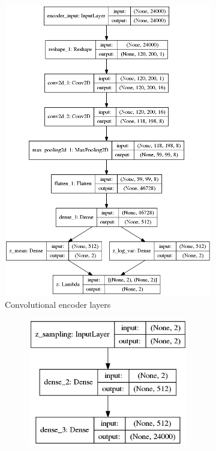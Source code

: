 \documentclass[a4paper]{article}
\begin{document}
\begin{figure}[h!]
	\centering
	\begin{subfigure}{.49\textwidth}
		\centering
		\includegraphics[width=1\linewidth]{vae_mlp_encoder}
		\caption{Convolutional encoder layers}
		\label{fig:encoder}
	\end{subfigure}
	\begin{subfigure}{.49\textwidth}
		\centering
		\begin{subfigure}{.6\textwidth}
			\centering
			\includegraphics[width=1\linewidth]{vae_mlp_decoder}

\end{subfigure}
\end{subfigure}
\end{figure}
\end{document}
